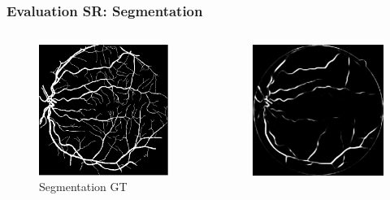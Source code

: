 \documentclass{beamer}
\begin{document}
\begin{frame} \frametitle{Evaluation SR: Segmentation}
  \begin{columns}
  \begin{column}{0.33\linewidth}
      \centering
      \begin{figure}[htb]
        \centering
        \includegraphics[width=1.0\textwidth]{segmentation_gt}
        \caption*{Segmentation GT}
      \end{figure}
    \end{column}
  \begin{column}{0.33\linewidth}
      \centering
      \begin{figure}[htb]
        \centering
        \includegraphics[width=1.0\textwidth]{segmentation_bic}

\end{figure}
\end{column}
\end{columns}
\end{frame}
\end{document}
